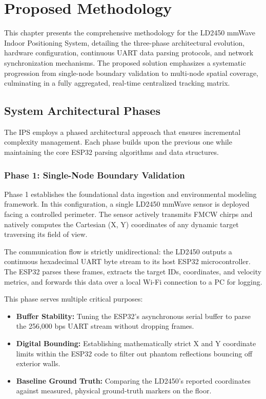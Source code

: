 \chapter{Proposed Methodology}
\label{Proposed_Methodology}

This chapter presents the comprehensive methodology for the LD2450 mmWave Indoor Positioning System, detailing the three-phase architectural evolution, hardware configuration, continuous UART data parsing protocols, and network synchronization mechanisms. The proposed solution emphasizes a systematic progression from single-node boundary validation to multi-node spatial coverage, culminating in a fully aggregated, real-time centralized tracking matrix.

\section{System Architectural Phases}
\label{sec:system-phases}

The IPS employs a phased architectural approach that ensures incremental complexity management. Each phase builds upon the previous one while maintaining the core ESP32 parsing algorithms and data structures.

\subsection{Phase 1: Single-Node Boundary Validation}
\label{subsec:phase1}

Phase 1 establishes the foundational data ingestion and environmental modeling framework. In this configuration, a single LD2450 mmWave sensor is deployed facing a controlled perimeter. The sensor actively transmits FMCW chirps and natively computes the Cartesian (X, Y) coordinates of any dynamic target traversing its field of view. 

The communication flow is strictly unidirectional: the LD2450 outputs a continuous hexadecimal UART byte stream to its host ESP32 microcontroller. The ESP32 parses these frames, extracts the target IDs, coordinates, and velocity metrics, and forwards this data over a local Wi-Fi connection to a PC for logging.

This phase serves multiple critical purposes:
\begin{itemize}
    \item \textbf{Buffer Stability:} Tuning the ESP32's asynchronous serial buffer to parse the 256,000 bps UART stream without dropping frames.
    \item \textbf{Digital Bounding:} Establishing mathematically strict X and Y coordinate limits within the ESP32 code to filter out phantom reflections bouncing off exterior walls.
    \item \textbf{Baseline Ground Truth:} Comparing the LD2450's reported coordinates against measured, physical ground-truth markers on the floor.
\end{itemize}

